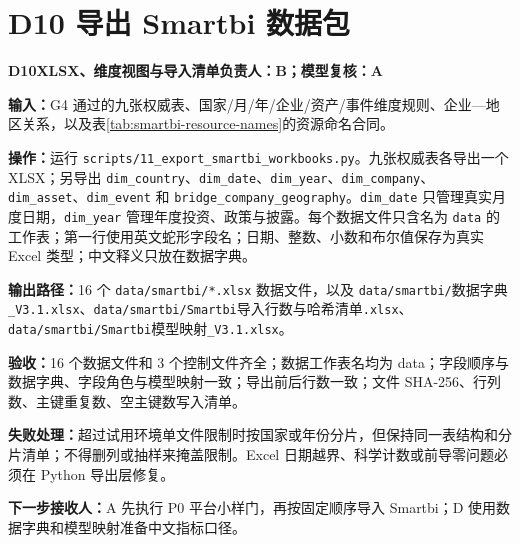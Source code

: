 \documentclass[UTF8,fontset=windows,12pt,openany]{ctexbook}
\newcommand{\Field}[1]{{\small\nolinkurl{#1}}}
\newcommand{\File}[1]{{\small\nolinkurl{#1}}}
\newcommand{\StepTitle}[3]{%
  \noindent\colorbox{DeepNavy}{\parbox{0.965\textwidth}{\color{white}\Large\bfseries #1\quad #2\hfill\normalsize #3}}\par\medskip
}
\newcommand{\CardRow}[2]{\noindent\textbf{#1：}#2\par}
\begin{document}
\section{D10 导出 Smartbi 数据包}
\StepTitle{D10}{XLSX、维度视图与导入清单}{负责人：B；模型复核：A}
\CardRow{输入}{G4 通过的九张权威表、国家/月/年/企业/资产/事件维度规则、企业—地区关系，以及表\ref{tab:smartbi-resource-names}的资源命名合同。}
\CardRow{操作}{运行 \File{scripts/11_export_smartbi_workbooks.py}。九张权威表各导出一个 XLSX；另导出 \Field{dim_country}、\Field{dim_date}、\Field{dim_year}、\Field{dim_company}、\Field{dim_asset}、\Field{dim_event} 和 \Field{bridge_company_geography}。\Field{dim_date} 只管理真实月度日期，\Field{dim_year} 管理年度投资、政策与披露。每个数据文件只含名为 \Field{data} 的工作表；第一行使用英文蛇形字段名；日期、整数、小数和布尔值保存为真实 Excel 类型；中文释义只放在数据字典。}
\CardRow{输出路径}{16 个 \File{data/smartbi/*.xlsx} 数据文件，以及 \File{data/smartbi/}\textsf{数据字典}\File{_V3.1.xlsx}、\File{data/smartbi/Smartbi}\textsf{导入行数与哈希清单}\File{.xlsx}、\File{data/smartbi/Smartbi}\textsf{模型映射}\File{_V3.1.xlsx}。}
\CardRow{验收}{16 个数据文件和 3 个控制文件齐全；数据工作表名均为 data；字段顺序与数据字典、字段角色与模型映射一致；导出前后行数一致；文件 SHA-256、行列数、主键重复数、空主键数写入清单。}
\CardRow{失败处理}{超过试用环境单文件限制时按国家或年份分片，但保持同一表结构和分片清单；不得删列或抽样来掩盖限制。Excel 日期越界、科学计数或前导零问题必须在 Python 导出层修复。}
\CardRow{下一步接收人}{A 先执行 P0 平台小样门，再按固定顺序导入 Smartbi；D 使用数据字典和模型映射准备中文指标口径。}
\end{document}
